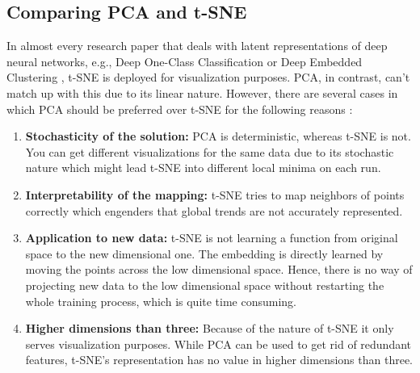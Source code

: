 \subsection{Comparing PCA and t-SNE} 
\label{subsec:ComparingPCAandtSNE}
In almost every research paper that deals with latent representations of deep neural networks, e.g., Deep One-Class Classification \cite{DOC} \cite{IntraClass} or Deep Embedded Clustering \cite{DEC} \cite{CDEC},  t-SNE is deployed for visualization purposes. PCA, in contrast, can't match up with this due to its linear nature. However, there are several cases in which PCA should be preferred over t-SNE for the following reasons \cite{PCAtSNE}:
\begin{enumerate}
\item \textbf{Stochasticity of the solution:} PCA is deterministic, whereas t-SNE is not. You can get different visualizations for the same data due to its stochastic nature which might lead t-SNE into different local minima on each run.
\item \textbf{Interpretability of the mapping:} t-SNE tries to map neighbors of points correctly which engenders that global trends are not accurately represented. 
\item \textbf{Application to new data:} t-SNE is not learning a function from original space to the new dimensional one. The embedding is directly learned by moving the points across the low dimensional space. Hence, there is no way of projecting new data to the low dimensional space without restarting the whole training process, which is quite time consuming.
\item \textbf{Higher dimensions than three:} Because of the nature of t-SNE it only serves visualization purposes. While PCA can be used to get rid of redundant features, t-SNE's representation has no value in higher dimensions than three.
\end{enumerate}


